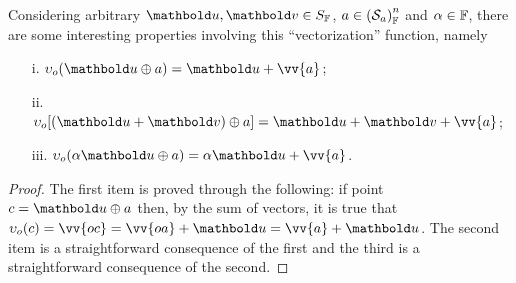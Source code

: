 Considering arbitrary $\vto{u},\vto{v}\in S_\cam{F}$, $a\in\eamsd{S}{F}{a}{n}$ and $\alpha\in\cam{F}$, there are some interesting properties involving this ``vectorization'' function, namely
\begin{itemize}
	\setlength\itemsep{.1em}
	\item[i.] $\fua{\upsilon_o}{\vto{u}\oplus a} =  \vto{u}+\vv{a}$;
	\item[ii.] ${\upsilon_o}[(\vto{u}+\vto{v})\oplus a] =  \vto{u}+\vto{v}+\vv{a}$;
	\item[iii.] $\fua{\upsilon_o}{\alpha\vto{u}\oplus a} =  \alpha\vto{u}+\vv{a}$.
\end{itemize}


{\footnotesize
\begin{proof}
The first item is proved through the following: if point $c=\vto{u}\oplus a$ then, by the sum of vectors, it is true that $\fua{\upsilon_o}{c}=\vv{oc}=\vv{oa}+\vto{u}=\vv{a}+\vto{u}$. The second item is a straightforward consequence of the first and the third is a straightforward consequence of the second.    
\end{proof}}


